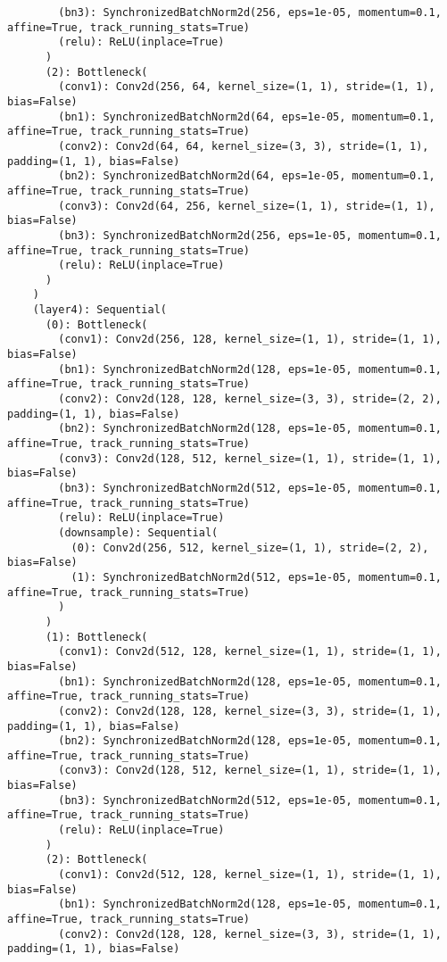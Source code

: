 \begin{verbatim}
        (bn3): SynchronizedBatchNorm2d(256, eps=1e-05, momentum=0.1, affine=True, track_running_stats=True)
        (relu): ReLU(inplace=True)
      )
      (2): Bottleneck(
        (conv1): Conv2d(256, 64, kernel_size=(1, 1), stride=(1, 1), bias=False)
        (bn1): SynchronizedBatchNorm2d(64, eps=1e-05, momentum=0.1, affine=True, track_running_stats=True)
        (conv2): Conv2d(64, 64, kernel_size=(3, 3), stride=(1, 1), padding=(1, 1), bias=False)
        (bn2): SynchronizedBatchNorm2d(64, eps=1e-05, momentum=0.1, affine=True, track_running_stats=True)
        (conv3): Conv2d(64, 256, kernel_size=(1, 1), stride=(1, 1), bias=False)
        (bn3): SynchronizedBatchNorm2d(256, eps=1e-05, momentum=0.1, affine=True, track_running_stats=True)
        (relu): ReLU(inplace=True)
      )
    )
    (layer4): Sequential(
      (0): Bottleneck(
        (conv1): Conv2d(256, 128, kernel_size=(1, 1), stride=(1, 1), bias=False)
        (bn1): SynchronizedBatchNorm2d(128, eps=1e-05, momentum=0.1, affine=True, track_running_stats=True)
        (conv2): Conv2d(128, 128, kernel_size=(3, 3), stride=(2, 2), padding=(1, 1), bias=False)
        (bn2): SynchronizedBatchNorm2d(128, eps=1e-05, momentum=0.1, affine=True, track_running_stats=True)
        (conv3): Conv2d(128, 512, kernel_size=(1, 1), stride=(1, 1), bias=False)
        (bn3): SynchronizedBatchNorm2d(512, eps=1e-05, momentum=0.1, affine=True, track_running_stats=True)
        (relu): ReLU(inplace=True)
        (downsample): Sequential(
          (0): Conv2d(256, 512, kernel_size=(1, 1), stride=(2, 2), bias=False)
          (1): SynchronizedBatchNorm2d(512, eps=1e-05, momentum=0.1, affine=True, track_running_stats=True)
        )
      )
      (1): Bottleneck(
        (conv1): Conv2d(512, 128, kernel_size=(1, 1), stride=(1, 1), bias=False)
        (bn1): SynchronizedBatchNorm2d(128, eps=1e-05, momentum=0.1, affine=True, track_running_stats=True)
        (conv2): Conv2d(128, 128, kernel_size=(3, 3), stride=(1, 1), padding=(1, 1), bias=False)
        (bn2): SynchronizedBatchNorm2d(128, eps=1e-05, momentum=0.1, affine=True, track_running_stats=True)
        (conv3): Conv2d(128, 512, kernel_size=(1, 1), stride=(1, 1), bias=False)
        (bn3): SynchronizedBatchNorm2d(512, eps=1e-05, momentum=0.1, affine=True, track_running_stats=True)
        (relu): ReLU(inplace=True)
      )
      (2): Bottleneck(
        (conv1): Conv2d(512, 128, kernel_size=(1, 1), stride=(1, 1), bias=False)
        (bn1): SynchronizedBatchNorm2d(128, eps=1e-05, momentum=0.1, affine=True, track_running_stats=True)
        (conv2): Conv2d(128, 128, kernel_size=(3, 3), stride=(1, 1), padding=(1, 1), bias=False)

\end{verbatim}
